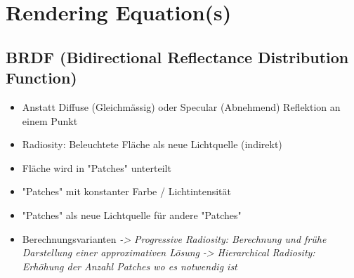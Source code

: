 \section{Rendering Equation(s)}

\subsection{BRDF (Bidirectional Reflectance Distribution Function)}

\begin{itemize}
	\item Anstatt Diffuse (Gleichmässig) oder Specular (Abnehmend) Reflektion an einem Punkt
	
	\item Radiosity: Beleuchtete Fläche als neue Lichtquelle (indirekt)
	
	\item Fläche wird in "Patches" unterteilt
	
	\item "Patches" mit konstanter Farbe / Lichtintensität
	
	\item "Patches" als neue Lichtquelle für andere "Patches"
	
	\item Berechnungsvarianten
	\textit{-> Progressive Radiosity: Berechnung und frühe Darstellung einer approximativen Lösung}
	\textit{-> Hierarchical Radiosity: Erhöhung der Anzahl Patches wo es notwendig ist}
\end{itemize}